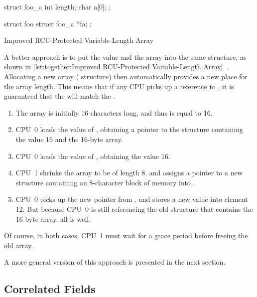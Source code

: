 \begin{listing}[tbp]
\begin{VerbatimL}[tabsize=8]
struct foo_a {
	int length;
	char a[0];
};

struct foo {
	struct foo_a *fa;
};
\end{VerbatimL}
\caption{Improved RCU-Protected Variable-Length Array}
\label{lst:together:Improved RCU-Protected Variable-Length Array}
\end{listing}

A better approach is to put the value and the array into the same structure,
as shown in
\cref{lst:together:Improved RCU-Protected Variable-Length Array}~\cite{Arcangeli03}.
Allocating a new array ( structure) then automatically provides
a new place for the array length.
This means that if any CPU picks up a reference to , it is
guaranteed that the  will match the .

\begin{enumerate}
\item	The array is initially 16 characters long, and thus 
	is equal to 16.
\item	CPU~0 loads the value of , obtaining a pointer to
	the structure containing the value 16 and the 16-byte array.
\item	CPU~0 loads the value of , obtaining the value 16.
\item	CPU~1 shrinks the array to be of length 8, and assigns a pointer
	to a new  structure containing an 8-character block
	of memory into .
\item	CPU~0 picks up the new pointer from , and stores a
	new value into element 12.
	But because CPU~0 is still referencing the old 
	structure that contains the 16-byte array, all is well.
\end{enumerate}

Of course, in both cases, CPU~1 must wait for a grace period before
freeing the old array.

A more general version of this approach is presented in the next section.

\subsection{Correlated Fields}
\label{sec:together:Correlated Fields}

